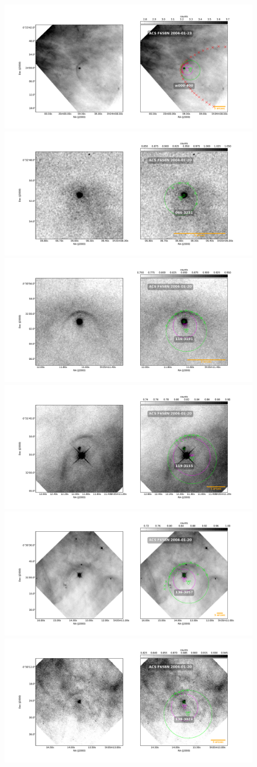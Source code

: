 \documentclass{article}
\begin{document}
\begin{figure}
\centering
    \includegraphics[width=0.5\linewidth]{j8oc09010_wcs/w000-400-Bally_09-images.pdf}
    \includegraphics[width=0.5\linewidth]{j8oc14010_wcs/066-3251-Bally_14-images.pdf}
    \includegraphics[width=0.5\linewidth]{j8oc14010_wcs/116-3101-Bally_14-images.pdf}
   \includegraphics[width=0.5\linewidth]{j8oc14010_wcs/119-3155-Bally_14-images.pdf}
   \includegraphics[width=0.5\linewidth]{j8oc14010_wcs/136-3057-Bally_14-images.pdf}
   \includegraphics[width=0.5\linewidth]{j8oc14010_wcs/138-3024-Bally_14-images.pdf}
 \label{fig:images}
\end{figure}
\end{document}
